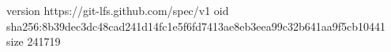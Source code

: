 version https://git-lfs.github.com/spec/v1
oid sha256:8b39dec3dc48cad241d14fc1e5f6fd7413ae8eb3eea99c32b641aa9f5cb10441
size 241719
